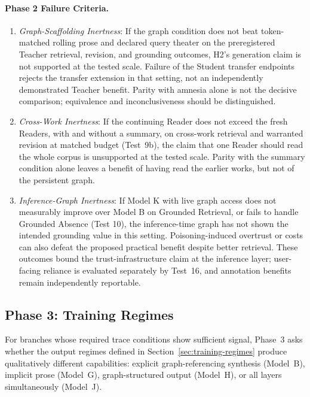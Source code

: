 \documentclass[11pt]{article}
\begin{document}
\paragraph{Phase 2 Failure Criteria.}
\begin{enumerate}
    \item \emph{Graph-Scaffolding Inertness}: If the graph condition does not
    beat token-matched rolling prose and declared query theater on the
    preregistered Teacher retrieval, revision, and grounding outcomes, H2's
    generation claim is not supported at the tested scale. Failure of the
    Student transfer endpoints rejects the transfer extension in that setting,
    not an independently demonstrated Teacher benefit. Parity with amnesia
        alone is not the decisive comparison; equivalence and inconclusiveness
    should be distinguished.
    \item \emph{Cross-Work Inertness}: If the continuing Reader does not exceed
    the fresh Readers, with and without a summary, on cross-work retrieval and
    warranted revision at matched budget (Test~9b), the claim that one Reader
    should read the whole corpus is unsupported at the tested scale. Parity
    with the summary condition alone leaves a benefit of having read the
    earlier works, but not of the persistent graph.
    \item \emph{Inference-Graph Inertness}: If Model K with live graph access does not measurably improve over Model B on Grounded Retrieval, or fails to handle Grounded Absence (Test 10), the inference-time graph has not shown the intended grounding value in this setting. Poisoning-induced overtrust or costs can also defeat the proposed practical benefit despite better retrieval. These outcomes bound the trust-infrastructure claim at the inference layer; user-facing reliance is evaluated separately by Test~16, and annotation benefits remain independently reportable.
\end{enumerate}

\subsection{Phase 3: Training Regimes}

For branches whose required trace conditions show sufficient signal, Phase~3
asks whether the output regimes defined in
Section~\ref{sec:training-regimes} produce qualitatively different
capabilities: explicit graph-referencing synthesis (Model~B), implicit prose
(Model~G), graph-structured output (Model~H), or all layers simultaneously
(Model~J).
\end{document}
